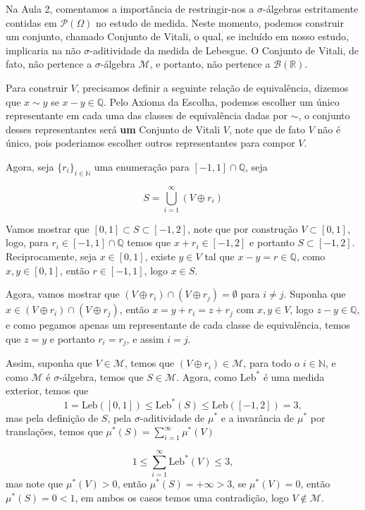 \begin{exemplo}

    Na Aula 2, comentamos a importância de restringir-nos a $\sigma$-álgebras 
    estritamente contidas em $\mathcal{P}(\Omega)$ no estudo de medida.
    Neste momento, podemos construir um conjunto, chamado Conjunto de Vitali, 
    o qual, se incluído em nosso estudo, implicaria na não $\sigma$-aditividade 
    da medida de Lebesgue. O Conjunto de Vitali, de fato, não
    pertence a $\sigma$-álgebra $\mathcal{M}$, e portanto, não pertence a 
    $\mathcal{B}(\mathbb{R})$.   
     
    Para construir $V$, precisamos definir a seguinte relação de equivalência, 
    dizemos que $x \sim y$ se $x-y \in \mathbb{Q}$. 
    Pelo Axioma da 
    Escolha, podemos escolher um único representante em cada uma das classes de 
    equivalência dadas por $\sim$, o conjunto desses representantes será \textbf{um}
    Conjunto de Vitali $V$, note que de fato $V$ não é único, pois 
    poderiamos escolher outros representantes para compor $V$.
    
    Agora, seja $\{r_i\}_{i \in \mathbb{N}}$ uma enumeração para 
    $[-1,1]\cap\mathbb{Q}$, seja
    
    \[
        S = \bigcup_{i=1}^{\infty} (V \oplus r_i)
    \]
    
    Vamos mostrar que $[0,1] \subset S \subset [-1,2]$, note que por construção 
    $V \subset [0,1]$, logo, para $r_i\in [-1,1]\cap \mathbb{Q}$ temos que
    $x + r_i \in [-1,2]$ e portanto $S \subset [-1,2]$. 
    Reciprocamente, seja $x \in [0,1]$, existe $y \in V$ tal que 
    $x-y = r \in \mathbb{Q}$, como $x,y \in [0,1]$, então $r \in [-1,1]$, 
    logo $x \in S$.
    
    Agora, vamos mostrar que $(V \oplus r_i )\cap (V \oplus r_j )= \emptyset$ 
    para $i\neq j$. Suponha que $x \in (V \oplus r_i )\cap (V \oplus r_j)$, então
    $x = y + r_i = z + r_j$ com $x,y \in V$, logo $z-y \in \mathbb{Q}$, e como pegamos
    apenas um representante de cada classe de equivalência, temos que $z=y$ e portanto
    $r_i = r_j$, e assim $i=j$.
    
    Assim, suponha que $V \in \mathcal{M}$, temos que $(V\oplus r_i) \in \mathcal{M}$, 
    para todo o $i \in \mathbb{N}$, e como $\mathcal{M}$  é $\sigma$-álgebra, temos
    que $S \in \mathcal{M}$. Agora, como $\mathrm{Leb}^*$ é uma medida exterior, temos 
    que 
    \[
        1=\mathrm{Leb}([0,1]) \le \mathrm{Leb}^*(S) \le \mathrm{Leb}([-1,2])=3,
    \]
    mas pela definição de $S$, pela $\sigma$-aditividade de $\mu^*$ e a invarância
    de $\mu^*$ por translações, temos que $\mu^*(S) = \sum_{i=1}^{\infty} \mu^*(V)$ 
    
    \[
         1 \le \sum_{i=1}^{\infty} \mathrm{Leb}^*(V) \le3,
    \]
    mas note que $\mu^*(V)>0$, então $\mu^*(S) =+\infty > 3$, se $\mu^*(V) = 0$, então
    $\mu^*(S)=0 <1$, em ambos os casos temos uma contradição, logo 
    $V \not \in \mathcal{M}$.
\end{exemplo}
